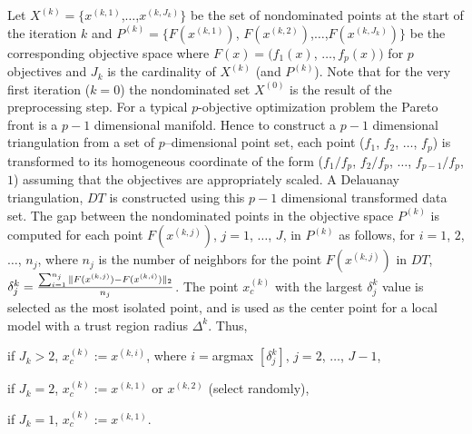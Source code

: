 \smallskip

\noindent Let $X^{(k)} = \bigl\{x^{(k,1)}$,$\ldots$,$x^{(k,J_k)}\bigr\}$ be the 
set of nondominated points at the start of the iteration $k$ and 
$P^{(k)} = \bigl\{F(x^{(k,1)})$, $F(x^{(k,2)})$,$\ldots$,$F(x^{(k,J_k)})\bigr
\}$ be the corresponding objective space where $F(x) = \bigl (f_1(x)$, 
$\ldots, f_p(x)\bigr )$ for $p$ objectives and $J_{k}$ is the cardinality of 
$X^{(k)}$ (and $P^{(k)}$). Note that for the very first iteration ($k=0$) the 
nondominated set $X^{(0)}$ is the result of the preprocessing step. For a 
typical $p$-objective optimization problem the Pareto front is a $p-1$ 
dimensional manifold. Hence to construct a $p-1$ dimensional triangulation from 
a set of $p$--dimensional point set,  each point ($f_1$, $f_2$, $\ldots$, $f_p$) 
is transformed to its homogeneous coordinate of the form ($f_1/f_p$, $f_2/f_p$,
$\ldots$, ${f_{p-1}}/f_p$, $1$) assuming that the objectives are appropriately
scaled. A Delauanay triangulation, $DT$ is constructed using this $p-1$
dimensional transformed data set. The gap between the nondominated points in
the objective space $P^{(k)}$ is computed for each point $F(x^{(k,j)})$, $j=1$,
$\ldots$, $J$, in $P^{(k)}$ as follows, 
for $i=1$, $2$, $\ldots$, $n_j$, where $n_j$ is the number of neighbors for 
the point $F(x^{(k,j)})$ in $DT$,
$\delta_j^k={{\sum_{i=1}^{n_j}{\|F(x^{(k,j)})-F(x^{(k,i)})\|_2}}\over {n_j}}$. 
The point $x_c^{(k)}$ with the largest $\delta_j^k$ 
value is selected as the most isolated point, and is used as the center point 
for a local model with a trust region radius $\Delta^k$. Thus,

\noindent if $J_k > 2$, $x_c^{(k)} := x^{(k,i)}$, where $i=$\hbox{argmax}
$[\delta_j^k]$, $j=2$, $\ldots$, $J-1$,

\noindent if $J_k = 2$,  $x_c^{(k)} := x^{(k,1)}$ or $x^{(k,2)}$ (select 
randomly),

\noindent if $J_k = 1$, $x_c^{(k)} := x^{(k,1)}$.

